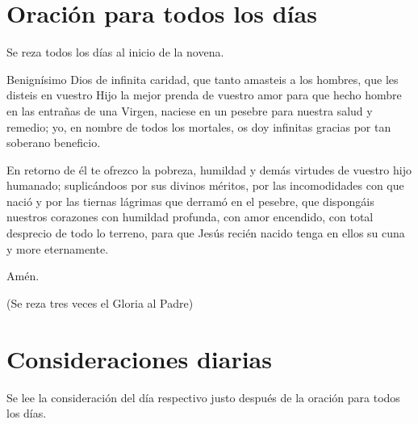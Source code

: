 \documentclass[spanish,utf8,twocolumn]{chlart}
\newenvironment{summary}{\begingroup
	\small\sffamily\itshape%
	\setlength{\leftskip}{3em}\setlength{\rightskip}{3em}\noindent
	}{\par\endgroup}
\newenvironment{lectura}{\begingroup\color{lector}}{\endgroup\par}
\newenvironment{finalnotes}{\begingroup
	\footnotesize\sffamily\color{Gray}%
	\setlength{\leftskip}{3em}\setlength{\rightskip}{3em}\noindent
	}{\par\endgroup}
\begin{document}
\section{Oración para todos los días}
\begin{summary}
Se reza todos los días al inicio de la novena.
\end{summary}
\begin{lectura}
Benignísimo Dios de infinita caridad, que tanto amasteis a los hombres,
que les disteis en vuestro Hijo la mejor prenda de vuestro amor para que
hecho hombre en las entrañas de una Virgen, naciese en un pesebre para
nuestra salud y remedio; yo, en nombre de todos los mortales, os doy
infinitas gracias por tan soberano beneficio.

En retorno de él te ofrezco la pobreza, humildad y demás virtudes de
vuestro hijo humanado; suplicándoos por sus divinos méritos, por las
incomodidades con que nació y por las tiernas lágrimas que derramó en
el pesebre, que dispongáis nuestros corazones con humildad profunda,
con amor encendido, con total desprecio de todo lo terreno, para que
Jesús recién nacido tenga en ellos su cuna y more eternamente.

Amén.
\end{lectura}
\begin{finalnotes}
(Se reza tres veces el Gloria al Padre)
\end{finalnotes}

\section{Consideraciones diarias}
\begin{summary}
Se lee la consideración del día respectivo justo después de la
oración para todos los días.
\end{summary}
\end{document}
